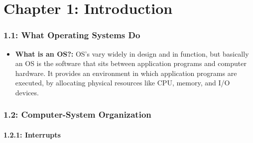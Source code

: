 \documentclass[12pt]{article}
\begin{document}
\part*{Chapter 1: Introduction}

\section*{1.1: What Operating Systems Do}

\begin{itemize}
    \item \textbf{What is an OS?:} OS's vary widely in design and in function, but basically an OS is the software that sits between application programs and computer hardware. It provides an environment in which application programs are executed, by allocating physical resources like CPU, memory, and I/O devices.
\end{itemize}

\section*{1.2: Computer-System Organization}

\subsection*{1.2.1: Interrupts}
\end{document}
